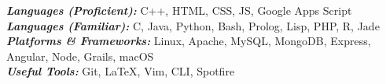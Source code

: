 

\begin{cvparagraph}
  \textbf{\textit{Languages (Proficient): }} C++, HTML, CSS, JS, Google Apps Script\\
  \textbf{\textit{Languages (Familiar): }}C, Java, Python, Bash, Prolog, Lisp, PHP, R, Jade \\
  \textbf{\textit{Platforms \& Frameworks: }}Linux, Apache, MySQL, MongoDB, Express, Angular, Node, Grails, macOS \\
  \textbf{\textit{Useful Tools: }}Git, \LaTeX, Vim, CLI, Spotfire
\end{cvparagraph}
